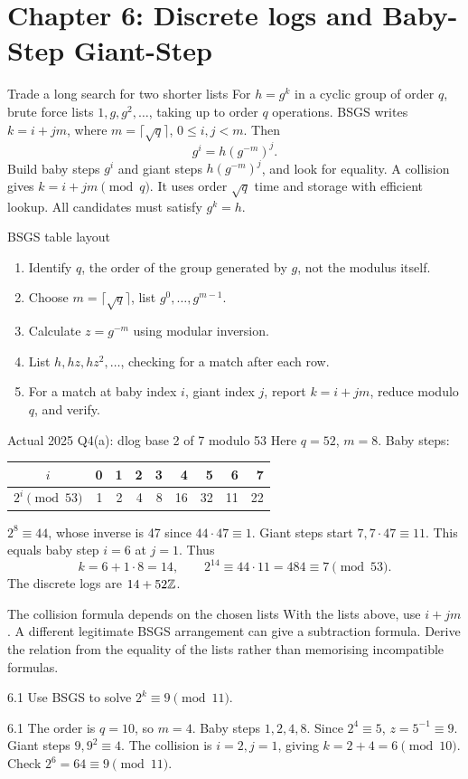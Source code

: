 \documentclass[11pt,a4paper]{article}
\begin{document}
\section{Chapter 6: Discrete logs and Baby-Step Giant-Step}
\begin{concept}{Trade a long search for two shorter lists}
For \(h=g^k\) in a cyclic group of order \(q\), brute force lists \(1,g,g^2,\ldots\), taking up to order \(q\) operations. BSGS writes \(k=i+jm\), where \(m=\lceil\sqrt q\rceil\), \(0\le i,j<m\). Then
\[g^i=h(g^{-m})^j.\]
Build baby steps \(g^i\) and giant steps \(h(g^{-m})^j\), and look for equality. A collision gives \(k=i+jm\pmod q\). It uses order \(\sqrt q\) time and storage with efficient lookup. All candidates must satisfy \(g^k=h\).
\end{concept}
\begin{method}{BSGS table layout}
\begin{enumerate}
\item Identify \(q\), the order of the group generated by \(g\), not the modulus itself.
\item Choose \(m=\lceil\sqrt q\rceil\), list \(g^0,\ldots,g^{m-1}\).
\item Calculate \(z=g^{-m}\) using modular inversion.
\item List \(h,hz,hz^2,\ldots\), checking for a match after each row.
\item For a match at baby index \(i\), giant index \(j\), report \(k=i+jm\), reduce modulo \(q\), and verify.
\end{enumerate}
\end{method}
\begin{example}{Actual 2025 Q4(a): dlog base 2 of 7 modulo 53}
Here \(q=52\), \(m=8\). Baby steps:
\begin{center}\begin{tabular}{c|rrrrrrrr}\(i\)&0&1&2&3&4&5&6&7\\\hline\(2^i\pmod{53}\)&1&2&4&8&16&32&11&22\end{tabular}\end{center}
\(2^8\equiv44\), whose inverse is 47 since \(44\cdot47\equiv1\). Giant steps start \(7,7\cdot47\equiv11\). This equals baby step \(i=6\) at \(j=1\). Thus
\[k=6+1\cdot8=14,\qquad 2^{14}\equiv44\cdot11=484\equiv7\pmod{53}.\]
The discrete logs are \(14+52\mathbb Z\).
\end{example}
\begin{tip}{The collision formula depends on the chosen lists}
With the lists above, use \(i+jm\). A different legitimate BSGS arrangement can give a subtraction formula. Derive the relation from the equality of the lists rather than memorising incompatible formulas.
\end{tip}
\begin{question}{6.1}
Use BSGS to solve \(2^k\equiv9\pmod{11}\).
\end{question}
\begin{answer}{6.1}
The order is \(q=10\), so \(m=4\). Baby steps \(1,2,4,8\). Since \(2^4\equiv5\), \(z=5^{-1}\equiv9\). Giant steps \(9,9^2\equiv4\). The collision is \(i=2,j=1\), giving \(k=2+4=6\pmod{10}\). Check \(2^6=64\equiv9\pmod{11}\).
\end{answer}
\end{document}
